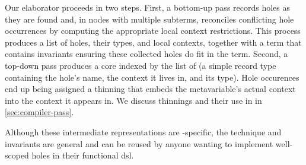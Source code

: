 Our elaborator proceeds in two steps.
%
First, a bottom-up pass records holes as they are found and, in nodes with multiple subterms, reconciles conflicting hole occurrences by computing the appropriate local context restrictions.
%
This process produces a list of holes, their types, and local contexts,
together with a  term that contains invariants ensuring
these collected holes do fit in the term.
%
Second, a top-down pass produces a core  indexed by the list of  (a simple record type containing the hole's name, the context it lives in, and its type).
%
Hole occurences end up being assigned a thinning that embeds the metavariable's actual context into the context it appears in.
We discuss thinnings and their use in \Velo{} in \ref{sec:compiler-pass}.

Although these intermediate representations are \Velo{}-specific, the technique
and invariants are general and can be reused by anyone wanting to implement
well-scoped holes in their functional \ac{dsl}.

